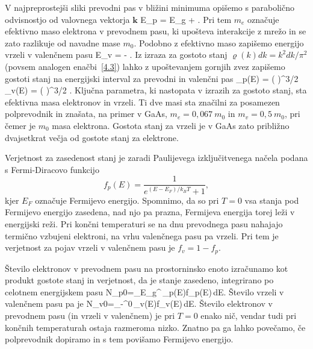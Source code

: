V najpreprostejši sliki prevodni pas v bližini minimuma opišemo 
s parabolično odvisnostjo od valovnega vektorja $\mathbf{k}$
\beq
E_p = E_g + .
\label{pp:Ec}
\eeq
Pri tem $m_e$ označuje efektivno maso elektrona v prevodnem pasu, ki upošteva
interakcije z mrežo in se zato razlikuje od navadne mase $m_0$.
Podobno z efektivno maso zapišemo energijo vrzeli v valenčnem pasu
\beq
E_v = - .
\label{pp:Ev}
\eeq
Iz izraza za gostoto stanj $\varrho(k) dk = k^2dk /\pi^2$ (povsem analogen 
enačbi~\ref{4.3}) lahko z upoštevanjem gornjih zvez zapišemo
gostoti stanj na energijski interval za prevodni in valenčni pas
\beq
\varrho_p(E) = \left( \right)^{3/2} 
\qquad {}\qquad
\varrho_v(E) = \left( \right)^{3/2} .
\label{eq:rho_p}
\eeq
Ključna parametra, ki nastopata v izrazih za gostoto stanj, sta efektivna masa 
elektronov in vrzeli. Ti dve masi sta značilni za posamezen polprevodnik
in znašata, na primer v GaAs, $m_e = 0,067~m_0$ in $m_v = 0,5~m_0$, pri 
čemer je $m_0$ masa elektrona. Gostota stanj za vrzeli je v GaAs zato približno 
dvajsetkrat večja od gostote stanj za elektrone.

Verjetnost za zasedenost stanj je zaradi Paulijevega izključitvenega
načela podana s Fermi-Diracovo funkcijo 
\begin{equation}  
f_p(E)=\frac{1}{e^{(E-E_F)/k_B T}+1},
\label{eq:7FD}
\end{equation}
kjer $E_F$ označuje Fermijevo energijo. Spomnimo, da so pri $T=0$ vsa stanja pod
Fermijevo energijo zasedena, nad njo pa prazna, Fermijeva energija torej leži
v energijski reži. Pri končni temperaturi se na dnu prevodnega pasu nahajajo 
termično vzbujeni elektroni, na vrhu valenčnega pasu pa vrzeli. Pri tem je
verjetnost za pojav vrzeli v valenčnem pasu je $f_v = 1 - f_p$.

Število elektronov v prevodnem pasu na prostorninsko enoto izračunamo kot 
produkt gostote stanj in verjetnost, da je stanje zasedeno, integrirano po 
celotnem energijskem pasu
\beq
N_{p0}=\int_{E_g}^{\infty}\,\rho_p(E)f_p(E)\,dE.
\label{6.3a}
\eeq
Število vrzeli v valenčnem pasu pa je 
\beq
N_{v0}=\int_{-\infty}^{0}\,\rho_v(E)f_v(E)\,dE.
\label{6.3b}
\eeq
Število elektronov v prevodnem pasu (in vrzeli v valenčnem) je pri
$T=0$ enako nič, vendar tudi pri končnih temperaturah ostaja razmeroma nizko. 
Znatno pa ga lahko povečamo, če polprevodnik dopiramo in s tem povišamo 
Fermijevo energijo.

